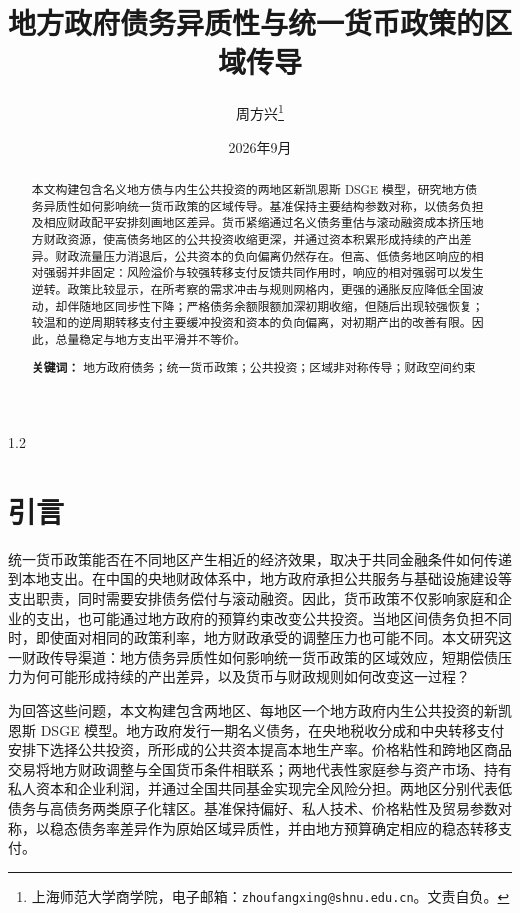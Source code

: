 \documentclass[12pt,UTF8]{ctexart}
\title{\textbf{地方政府债务异质性与统一货币政策的区域传导}}
\author{\quad 周方兴\thanks{上海师范大学商学院，电子邮箱：\texttt{zhoufangxing@shnu.edu.cn}。文责自负。} }
\date{2026年9月}
\begin{document}
	\maketitle
	\begin{spacing}{1.2}
		
		\begin{abstract}
			本文构建包含名义地方债与内生公共投资的两地区新凯恩斯 DSGE 模型，研究地方债务异质性如何影响统一货币政策的区域传导。基准保持主要结构参数对称，以债务负担及相应财政配平安排刻画地区差异。货币紧缩通过名义债务重估与滚动融资成本挤压地方财政资源，使高债务地区的公共投资收缩更深，并通过资本积累形成持续的产出差异。财政流量压力消退后，公共资本的负向偏离仍然存在。但高、低债务地区响应的相对强弱并非固定：风险溢价与较强转移支付反馈共同作用时，响应的相对强弱可以发生逆转。政策比较显示，在所考察的需求冲击与规则网格内，更强的通胀反应降低全国波动，却伴随地区同步性下降；严格债务余额限额加深初期收缩，但随后出现较强恢复；较温和的逆周期转移支付主要缓冲投资和资本的负向偏离，对初期产出的改善有限。因此，总量稳定与地方支出平滑并不等价。
			
			\vspace{0.3cm}
			\noindent\textbf{关键词：} 地方政府债务；统一货币政策；公共投资；区域非对称传导；财政空间约束
		\end{abstract}
		
		\newpage
		
		\section{引言}
		
		统一货币政策能否在不同地区产生相近的经济效果，取决于共同金融条件如何传递到本地支出。在中国的央地财政体系中，地方政府承担公共服务与基础设施建设等支出职责，同时需要安排债务偿付与滚动融资。因此，货币政策不仅影响家庭和企业的支出，也可能通过地方政府的预算约束改变公共投资。当地区间债务负担不同时，即使面对相同的政策利率，地方财政承受的调整压力也可能不同。本文研究这一财政传导渠道：地方债务异质性如何影响统一货币政策的区域效应，短期偿债压力为何可能形成持续的产出差异，以及货币与财政规则如何改变这一过程？
		
		为回答这些问题，本文构建包含两地区、每地区一个地方政府内生公共投资的新凯恩斯 DSGE 模型。地方政府发行一期名义债务，在央地税收分成和中央转移支付安排下选择公共投资，所形成的公共资本提高本地生产率。价格粘性和跨地区商品交易将地方财政调整与全国货币条件相联系；两地代表性家庭参与资产市场、持有私人资本和企业利润，并通过全国共同基金实现完全风险分担。两地区分别代表低债务与高债务两类原子化辖区。基准保持偏好、私人技术、价格粘性及贸易参数对称，以稳态债务率差异作为原始区域异质性，并由地方预算确定相应的稳态转移支付。
		

\end{spacing}
\end{document}
